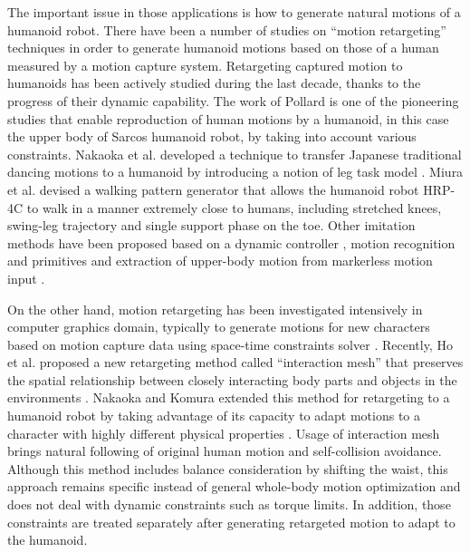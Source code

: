 \documentclass[letterpaper, 10 pt, conference]{ieeeconf}  %
\begin{document}
The important issue in those applications is how to generate natural
motions of a humanoid robot.  There have been a number of studies on
``motion retargeting'' techniques in order to generate humanoid
motions based on those of a human measured by a motion capture system.
Retargeting captured motion to humanoids has been actively studied
during the last decade, thanks to the progress of their dynamic
capability. The work of Pollard \cite{Pollard02ICRA} is one of the
pioneering studies that enable reproduction of human motions by a
humanoid, in this case the upper body of Sarcos humanoid robot, by
taking into account various constraints.  Nakaoka et al. developed a
technique to transfer Japanese traditional dancing motions to a
humanoid by introducing a notion of leg task model
\cite{nakaoka_icra2004,nakaoka_2007}.  Miura et al. \cite{Miura11IROS}
devised a walking pattern generator that allows the humanoid robot
HRP-4C to walk in a manner extremely close to humans, including
stretched knees, swing-leg trajectory and single support phase on the
toe.  Other imitation methods have been proposed based on a dynamic
controller \cite{Yamane11humanoids,Ramos11humanoids}, motion
recognition and primitives \cite{Ott08humanoids} and extraction of
upper-body motion from markerless motion input
\cite{Dariush08IROS,Do08humanoids}.



%




On the other hand, motion retargeting has been investigated
intensively in computer graphics domain, typically to generate motions
for new characters based on motion capture data using space-time
constraints solver \cite{Gleicher98}.  Recently, Ho et al. proposed a
new retargeting method called ``interaction mesh'' that preserves the
spatial relationship between closely interacting body parts and
objects in the environments \cite{Komura10}.  Nakaoka and Komura
extended this method for retargeting to a humanoid robot by taking
advantage of its capacity to adapt motions to a character with highly
different physical properties \cite{Nakaoka12Humanoids}. Usage of
interaction mesh brings natural following of original human motion and
self-collision avoidance.  Although this method includes 
balance consideration by shifting the waist, this approach remains
specific instead of general whole-body motion optimization and 
does not deal with dynamic constraints such as torque limits. 
In addition, those constraints are treated separately after
generating retargeted motion to adapt to the humanoid.
\end{document}
